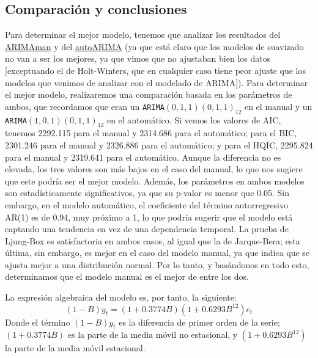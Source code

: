\documentclass[a4paper,onecolumn]{extarticle}
\begin{document}
\begin{sloppypar}
\subsection{Comparación y conclusiones}\label{compConcl}
Para determinar el mejor modelo, tenemos que analizar los resultados del \hyperref[modelo manual]{ARIMAman} y del \hyperref[modelo automático]{autoARIMA} (ya que 
está claro que los modelos de suavizado no van a ser los mejores, ya que vimos que no ajustaban bien los datos [exceptuando el de Holt-Winters, que en cualquier 
caso tiene peor ajuste que los modelos que venimos de analizar con el modelado de ARIMA]). Para determinar el mejor modelo, realizaremos una comparación basada 
en los parámetros de ambos, que recordamos que eran un \texttt{ARIMA$(0,1,1)(0,1,1)_{12}$} en el manual y un \texttt{ARIMA$(1,0,1)(0,1,1)_{12}$} en el 
automático. Si vemos los valores de AIC, tenemos 2292.115 para el manual y 2314.686 para el automático; para el BIC, 2301.246 para el manual y 2326.886 para 
el automático; y para el HQIC, 2295.824 para el manual y 2319.641 para el automático. Aunque la diferencia no es elevada, los tres valores son más bajos en el 
caso del manual, lo que nos sugiere que este podría ser el mejor modelo. Además, los parámetros en ambos modelos son estadísticamente significativos, ya que 
su p-valor es menor que 0.05. Sin embargo, en el modelo automático, el coeficiente del término autorregresivo AR(1) es de 0.94, muy próximo a 1, lo que podría 
sugerir que el modelo está captando una tendencia en vez de una dependencia temporal. La prueba de Ljung-Box es satisfactoria en ambos casos, al igual que la 
de Jarque-Bera; esta última, sin embargo, es mejor en el caso del modelo manual, ya que indica que se ajusta mejor a una distribución normal. Por lo tanto, y 
basándonos en todo esto, determinamos que el modelo manual es el mejor de entre los dos.

La expresión algebraica del modelo es, por tanto, la siguiente:
\begin{equation}
(1 - B)y_t = (1 + 0.3774B)(1+0.6293B^{12})e_t
\end{equation}
Donde el término $(1 - B)y_t$ es la diferencia de primer orden de la serie; $(1 + 0.3774B)$ es la parte de la media móvil no estacional, y $(1+0.6293B^{12})$ 
la parte de la media móvil estacional.


\end{sloppypar}
\end{document}

